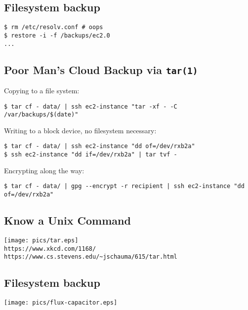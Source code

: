 \documentclass[xga]{xdvislides}
\begin{document}
\subsection{Filesystem backup}
\smallish
\begin{verbatim}
$ rm /etc/resolv.conf # oops
$ restore -i -f /backups/ec2.0
...
\end{verbatim}

\subsection{Poor Man's Cloud Backup via {\tt tar(1)}}
Copying to a file system:
\begin{verbatim}
$ tar cf - data/ | ssh ec2-instance "tar -xf - -C /var/backups/$(date)"
\end{verbatim}

\vspace{.5in}
Writing to a block device, no filesystem necessary:
\begin{verbatim}
$ tar cf - data/ | ssh ec2-instance "dd of=/dev/rxb2a"
$ ssh ec2-instance "dd if=/dev/rxb2a" | tar tvf -
\end{verbatim}

\vspace{.5in}
Encrypting along the way:
\begin{verbatim}
$ tar cf - data/ | gpg --encrypt -r recipient | ssh ec2-instance "dd of=/dev/rxb2a"
\end{verbatim}

\subsection{Know a Unix Command}
\vspace*{\fill}
\begin{center}
	\texttt{[image: pics/tar.eps]} \\
	\verb+https://www.xkcd.com/1168/+ \\
	\verb+https://www.cs.stevens.edu/~jschauma/615/tar.html+
\end{center}
\vspace*{\fill}

\subsection{Filesystem backup}
\vspace*{\fill}
\begin{center}
	\texttt{[image: pics/flux-capacitor.eps]}
\end{center}
\vspace*{\fill}
\end{document}
